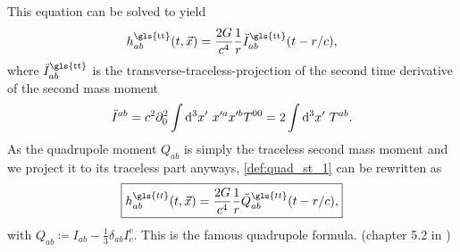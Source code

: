 This equation can be solved to yield
\begin{equation}
h_{ab}^\text{\gls{tt}}\lr{t,\vec{x}}=\frac{2 G}{c^4}\frac{1}{r}\ddot{I}_{ab}^\text{\gls{tt}}\lr{t-r/c},
\end{equation}
where $\ddot{I}_{ab}^\text{\gls{tt}}$ is the transverse-traceless-projection of the second time derivative of the second mass moment
\begin{equation}\label{def:quad_st_1}
\ddot{I}^{ab}=c^2\partial_0^2 \int\mathop{}\!\mathrm{d^3}x'\ x'^a x'^b T^{00} = 2\int\mathop{}\!\mathrm{d^3}x'\ T^{ab}.
\end{equation}
As the quadrupole moment $Q_{ab}$ is simply the traceless second mass moment and we project it to its traceless part anyways, \eqref{def:quad_st_1} can be rewritten as
\begin{equation}\label{def:h_quadrupole}
\boxed{h^{\gls{tt}}_{ab}\lr{t,\vec{x}} = \frac{2 G}{c^4}\frac{1}{r}\ddot{Q}^{\gls{tt}}_{ab}\lr{t-r/c},}
\end{equation}
with $Q_{ab}\coloneqq I_{ab} - \frac{1}{3}\delta_{ab}I^c_c$. This is the famous quadrupole formula. (chapter 5.2 in \cite{bachelor})\medskip\\

